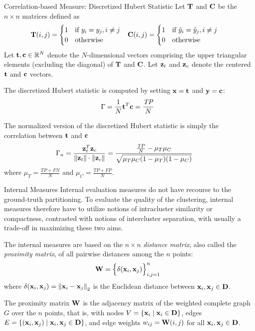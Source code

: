 \begin{frame}{Correlation-based Measure: Discretized Hubert Statistic}
Let $\mathbf{T}$ and $\mathbf{C}$ be the $n \times n$ matrices def\/{i}ned as
\begin{align*}
  \mathbf{T}(i,j) & =
  \begin{cases}
    1 & \text{if } y_i = y_{j}, i \ne j\\
    0 & \text{otherwise}
  \end{cases} &
  \mathbf{C}(i,j) & =
  \begin{cases}
    1 & \text{if } \hat{y}_i = \hat{y}_{j}, i \ne j\\
    0 & \text{otherwise}
 \end{cases}
\end{align*}
Let $\mathbf{t}, \mathbf{c} \in {\mathord{\mathbb R}}^N$ denote the $N$-dimensional vectors
comprising the upper triangular elements (excluding the diagonal)
of $\mathbf{T}$ and $\mathbf{C}$.
Let $\mathbf{z}_t$ and $\mathbf{z}_c$ denote the centered $\mathbf{t}$ and $\mathbf{c}$
vectors.

\medskip
The discretized Hubert statistic is computed
by setting $\mathbf{x} = \mathbf{t}$ and $\mathbf{y} = \mathbf{c}$:
\begin{align*}
  \Gamma = \frac{1}{N} \mathbf{t}^T\mathbf{c} = \frac{\mathit{TP}}{N}
\end{align*}

\medskip
The
normalized version of the discretized Hubert statistic is simply
the correlation between $\mathbf{t}$ and $\mathbf{c}$
\begin{align*}
  \Gamma_n &
  = \frac{\mathbf{z}_t^T\mathbf{z}_c}
  {\left\lVert\mathbf{z}_t\right\rVert\cdot \left\lVert\mathbf{z}_c\right\rVert} 
=\frac{\tfrac{\mathit{TP}}{N} - \mu_T \mu_C}
  {\sqrt{\mu_T\mu_C (1-\mu_T)(1-\mu_C)}}
\end{align*}
where $\mu_T = \tfrac{\mathit{TP}+\mathit{FN}}{N}$ and $\mu_C =
\tfrac{\mathit{TP}+\mathit{FP}}{N}$.
\end{frame}


\begin{frame}{Internal Measures}
Internal evaluation measures do not have recourse to the ground-truth
partitioning. To evaluate the
quality of the clustering, internal measures
therefore have to utilize notions of intracluster similarity
or compactness, contrasted with notions of intercluster separation,
with usually a trade-off in maximizing these two aims.

\medskip
The internal measures are based on the $n\times n$ {\em
distance matrix}, also called the {\em proximity matrix}, of all
pairwise distances among the $n$ points:
\begin{align*}
  \mathbf{W} = \Bigl\{ \delta(\mathbf{x}_i, \mathbf{x}_{j}) \Bigr\}_{i,j=1}^n 
\end{align*}
where $\delta(\mathbf{x}_i, \mathbf{x}_{j}) = \left\lVert\mathbf{x}_i - \mathbf{x}_{j}\right\rVert_2$
is the Euclidean
distance between $\mathbf{x}_i, \mathbf{x}_{j} \in \mathbf{D}$.


\medskip
The proximity matrix $\mathbf{W}$ is 
the adjacency matrix of the weighted complete graph $G$ over
the $n$ points, that is, with nodes $V = \{\mathbf{x}_i \mid \mathbf{x}_i \in \mathbf{D}\}$, edges
$E=\{(\mathbf{x}_i, \mathbf{x}_{j})\mid \mathbf{x}_i, \mathbf{x}_{j} \in \mathbf{D}\}$, and edge weights
$w_{ij} = \mathbf{W}(i, j)$ for all $\mathbf{x}_i, \mathbf{x}_{j}\in \mathbf{D}$.
\end{frame}


